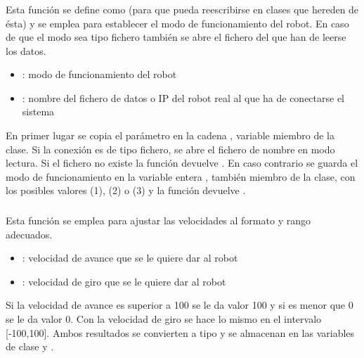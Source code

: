 \subsubsection{}

\noindent
{}

\noindent
Esta función se define como  (para que pueda reescribirse en clases que hereden de ésta) y se emplea para establecer el modo de funcionamiento del robot. En caso de que el modo sea tipo fichero también se abre el fichero del que han de leerse los datos.

\begin{itemize}
  \item {}: modo de funcionamiento del robot
  \item {}: nombre del fichero de datos o IP del robot real al que ha de conectarse el sistema
\end{itemize}

\noindent
En primer lugar se copia el parámetro  en la cadena , variable miembro de la clase. Si la conexión es de tipo fichero, se abre el fichero de nombre  en modo lectura. Si el fichero no existe la función devuelve . En caso contrario se guarda el modo de funcionamiento en la variable entera , también miembro de la clase, con los posibles valores  (1),  (2) o  (3) y la función devuelve .

\subsubsection{}

\noindent
{}

\noindent
Esta función se emplea para ajustar las velocidades al formato y rango adecuados.

\begin{itemize}
  \item {}: velocidad de avance que se le quiere dar al robot
  \item {}: velocidad de giro que se le quiere dar al robot
\end{itemize}

\noindent
Si la velocidad de avance es superior a 100 se le da valor 100 y si es menor que 0 se le da valor 0. Con la velocidad de giro se hace lo mismo en el intervalo [-100,100]. Ambos resultados se convierten a tipo  y se almacenan en las variables de clase  y .


